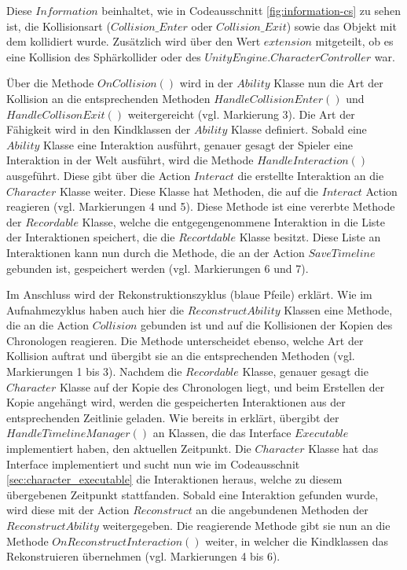 Diese $Information$ beinhaltet, wie in Codeausschnitt \ref{fig:information-cs} zu sehen ist, die Kollisionsart ($Collision\_Enter$ oder $Collision\_Exit$) sowie das Objekt mit dem kollidiert wurde. Zusätzlich wird über den Wert $extension$ mitgeteilt, ob es eine Kollision des Sphärkollider oder des $UnityEngine.CharacterController$ war. 

Über die Methode $OnCollision()$ wird in der $Ability$ Klasse nun die Art der Kollision an die entsprechenden Methoden $HandleCollisionEnter()$ und $HandleCollisonExit()$ weitergereicht (vgl. Markierung 3). Die Art der Fähigkeit wird in den Kindklassen der $Ability$ Klasse definiert. Sobald eine $Ability$ Klasse eine Interaktion ausführt, genauer gesagt der Spieler eine Interaktion in der Welt ausführt, wird die Methode $HandleInteraction()$ ausgeführt. Diese gibt über die Action $Interact$ die erstellte Interaktion an die $Character$ Klasse weiter. Diese Klasse hat Methoden, die auf die $Interact$ Action reagieren (vgl. Markierungen 4 und 5). Diese Methode ist eine vererbte Methode der $Recordable$ Klasse, welche die entgegengenommene Interaktion in die Liste der Interaktionen speichert, die die $Recortdable$ Klasse besitzt. Diese Liste an Interaktionen kann nun durch die Methode, die an der Action $SaveTimeline$ gebunden ist, gespeichert werden (vgl. Markierungen 6 und 7).

Im Anschluss wird der Rekonstruktionszyklus (blaue Pfeile) erklärt.
Wie im Aufnahmezyklus haben auch hier die $ReconstructAbility$ Klassen eine Methode, die an die Action $Collision$ gebunden ist und auf die Kollisionen der Kopien des Chronologen reagieren. Die Methode unterscheidet ebenso, welche Art der Kollision auftrat und übergibt sie an die entsprechenden Methoden (vgl. Markierungen 1 bis 3). 
Nachdem die $Recordable$ Klasse, genauer gesagt die $Character$ Klasse auf der Kopie des Chronologen liegt, und beim Erstellen der Kopie angehängt wird, werden die gespeicherten Interaktionen aus der entsprechenden Zeitlinie geladen. Wie bereits in  erklärt, übergibt der $HandleTimelineManager()$ an Klassen, die das Interface $Executable$ implementiert haben, den aktuellen Zeitpunkt. Die $Character$ Klasse hat das Interface implementiert und sucht nun wie im Codeausschnit \ref{sec:character_executable} die Interaktionen heraus, welche zu diesem übergebenen Zeitpunkt stattfanden. Sobald eine Interaktion gefunden wurde, wird diese mit der Action $Reconstruct$ an die angebundenen Methoden der $ReconstructAbility$ weitergegeben. Die reagierende Methode gibt sie nun an die Methode $OnReconstructInteraction()$ weiter, in welcher die Kindklassen das Rekonstruieren übernehmen (vgl. Markierungen 4 bis 6).

